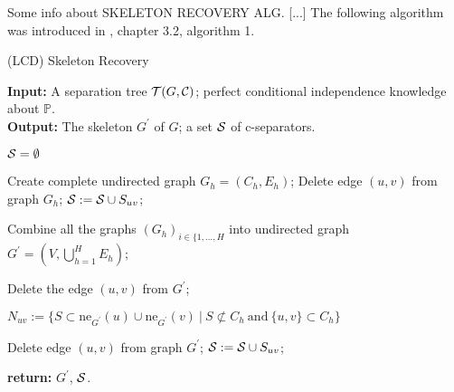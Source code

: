 %
%


Some info about SKELETON RECOVERY ALG.
[...] The following algorithm was introduced in \cite{CG}, chapter 3.2, algorithm 1.

\begin{algorithm}
	\caption{(LCD) Skeleton Recovery}\label{skeletonRecoveryAlg}
	
	\textbf{Input:} A separation tree $ \mathcal{T}(G, \mathcal{C})$; 
					perfect conditional independence knowledge about $\mathbb{P}$.  \\
	\textbf{Output:} The skeleton $G^{'}$ of $G$; a set $\mathcal{S}$ of c-separators.

	
	\begin{algorithmic}[1]
			\State $\mathcal{S} = \emptyset$
	
				\State	Create complete undirected graph $G_h = (C_h, E_h)$;
						\State Delete edge $(u, v)$ from graph $G_h$;
						\State $\mathcal{S} := \mathcal{S} \cup S_{uv}$; 
					\EndIf
				\EndFor
			\EndFor			
		
			\State Combine all the graphs $(G_h)_{i \in \{1, \dots, H}$ into undirected graph 
			$G^{'} = (V, \bigcup_{h = 1}^{H} E_h)$;
			
					\State Delete the edge $(u, v)$ from $G^{'}$;
				\EndIf
			\EndFor
			
					
				\State $N_{uv} := \{S \subset \mbox{ne}_{G^{'}}(u) \cup \mbox{ne}_{G^{'}}(v) \ | \ 
									S \not\subset C_h \ \mbox{and} \ \{u, v\} \subset C_h  \}$
									
					\State Delete edge $(u, v)$ from graph $G^{'}$;
					\State $\mathcal{S} := \mathcal{S} \cup S_{uv}$; 
				\EndIf
			\EndFor	
			
			\State \textbf{return:} $G^{'}$, $\mathcal{S}$.
		\EndProcedure
	\end{algorithmic}
\end{algorithm}


